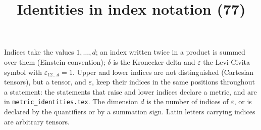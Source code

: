 \documentclass[11pt,a4paper]{article}
\title{Identities in index notation (77)}
\author{}
\date{}
\begin{document}
\maketitle
Indices take the values $1, \dots, d$; an index written twice in a product is summed over them (Einstein convention); $\delta$ is the Kronecker delta and $\varepsilon$ the Levi-Civita symbol with $\varepsilon_{12 \dots d} = 1$. Upper and lower indices are not distinguished (Cartesian tensors), but a tensor, and $\varepsilon$, keep their indices in the same positions throughout a statement: the statements that raise and lower indices declare a metric, and are in \texttt{metric\_identities.tex}. The dimension $d$ is the number of indices of $\varepsilon$, or is declared by the quantifiers or by a summation sign. Latin letters carrying indices are arbitrary tensors.
\end{document}
